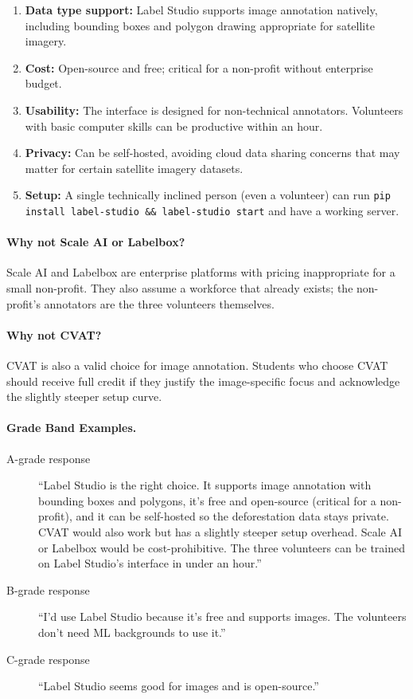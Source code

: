 \begin{enumerate}
    \item \textbf{Data type support:} Label Studio supports image annotation natively, including bounding boxes and polygon drawing appropriate for satellite imagery.
    \item \textbf{Cost:} Open-source and free; critical for a non-profit without enterprise budget.
    \item \textbf{Usability:} The interface is designed for non-technical annotators. Volunteers with basic computer skills can be productive within an hour.
    \item \textbf{Privacy:} Can be self-hosted, avoiding cloud data sharing concerns that may matter for certain satellite imagery datasets.
    \item \textbf{Setup:} A single technically inclined person (even a volunteer) can run \texttt{pip install label-studio \&\& label-studio start} and have a working server.
\end{enumerate}

\paragraph{Why not Scale AI or Labelbox?}

Scale AI and Labelbox are enterprise platforms with pricing inappropriate for a small non-profit. They also assume a workforce that already exists; the non-profit's annotators are the three volunteers themselves.

\paragraph{Why not CVAT?}

CVAT is also a valid choice for image annotation. Students who choose CVAT should receive full credit if they justify the image-specific focus and acknowledge the slightly steeper setup curve.

\paragraph{Grade Band Examples.}

\begin{description}
    \item[A-grade response] ``Label Studio is the right choice. It supports image annotation with bounding boxes and polygons, it's free and open-source (critical for a non-profit), and it can be self-hosted so the deforestation data stays private. CVAT would also work but has a slightly steeper setup overhead. Scale AI or Labelbox would be cost-prohibitive. The three volunteers can be trained on Label Studio's interface in under an hour.''

    \item[B-grade response] ``I'd use Label Studio because it's free and supports images. The volunteers don't need ML backgrounds to use it.''

    \item[C-grade response] ``Label Studio seems good for images and is open-source.''
\end{description}

